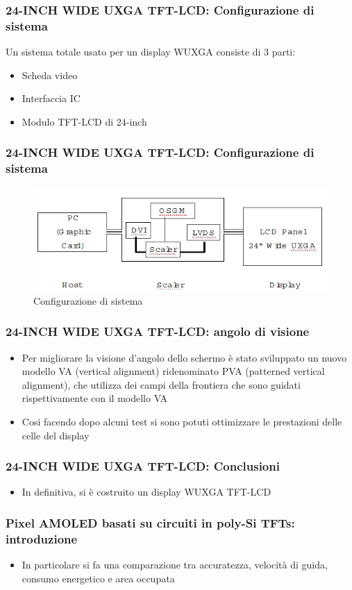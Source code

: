 \documentclass[12pt]{beamer}
\begin{document}
	\begin{frame}
		\frametitle{24-INCH WIDE UXGA TFT-LCD: Configurazione di sistema}
		Un sistema totale usato per un display WUXGA consiste di 3 parti:
		\begin{itemize}
			\item Scheda video
			\item Interfaccia IC
			\item Modulo TFT-LCD di 24-inch
		\end{itemize}
	\end{frame}
	\begin{frame}
		\frametitle{24-INCH WIDE UXGA TFT-LCD: Configurazione di sistema}
		\begin{figure}
			\centering
			\includegraphics[width=1\linewidth]{FISICA/sistema_di_conf}
			\caption{Configurazione di sistema}
			\label{fig:sistemadiconf}
		\end{figure}
	\end{frame}
	\begin{frame}
		\frametitle{24-INCH WIDE UXGA TFT-LCD: angolo di visione}
		\begin{itemize}
			\item Per migliorare la visione d’angolo dello schermo è stato sviluppato un nuovo
			modello VA (vertical alignment) ridenominato PVA (patterned
			vertical alignment), che utilizza dei campi della frontiera che sono guidati rispettivamente con il modello VA
			\pause
			\item Cosi facendo dopo alcuni test si sono potuti ottimizzare le prestazioni delle celle del display 
		\end{itemize}
	\end{frame}
	\begin{frame}
		\frametitle{24-INCH WIDE UXGA TFT-LCD: Conclusioni}
		\begin{itemize}
			\item In definitiva, si è costruito un display WUXGA TFT-LCD 
		\end{itemize}
	\end{frame}
	\begin{frame}
		\frametitle{Pixel AMOLED basati su circuiti in poly-Si TFTs: introduzione}
		\begin{itemize}
			\item In particolare si fa una comparazione tra accuratezza, velocità di guida, consumo
			energetico e area occupata
		\end{itemize}
	\end{frame}
\end{document}
